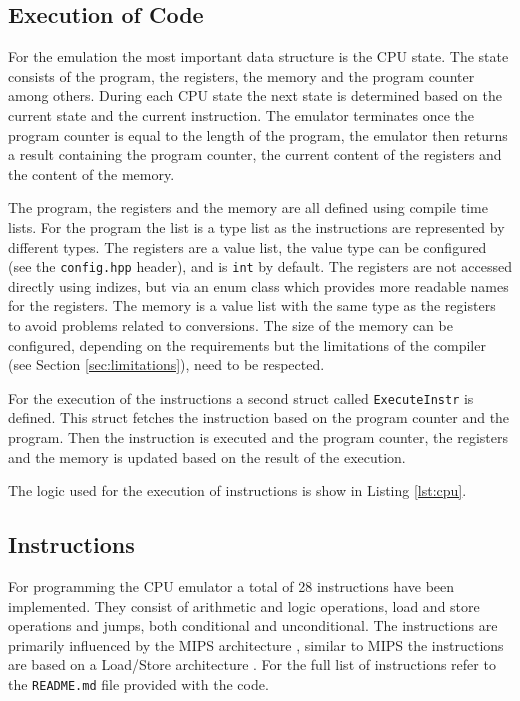 
\subsection{Execution of Code}
For the emulation the most important data structure is the CPU state. The state consists of the program, the registers,
the memory and the program counter among others. During each CPU state the next state is determined based on the 
current state and the current instruction.
The emulator terminates once the program counter is equal to the length of the program,
the emulator then returns a result containing the program counter, the current content
of the registers and the content of the memory.

The program, the registers and the memory are all defined using  compile time lists.
For the program the list is a type list as the instructions are represented by different
types. The registers are a value list, the value type can be configured (see the
\texttt{config.hpp} header), and is \lstinline{int} by default. The registers are not
accessed directly using indizes, but via an enum class which provides
more readable names for the registers. The memory is a value list with the same type
as the registers to avoid problems related to conversions. The size of the memory
can be configured, depending on the requirements but the limitations of the compiler 
(see Section \ref{sec:limitations}), need to be respected.

For the execution of the instructions a second struct called \lstinline{ExecuteInstr} is defined. 
This struct fetches the instruction based on the program counter and the program. Then
the instruction is executed and the program counter, the registers and the memory is
updated based on the result of the execution.

The logic used for the execution of instructions is show in Listing \ref{lst:cpu}.



\subsection{Instructions}
For programming the CPU emulator a total of 28 instructions have been implemented. They consist of arithmetic and logic
operations, load and store operations and jumps, both conditional and unconditional. The instructions are primarily 
influenced by the MIPS architecture , similar to MIPS the instructions are based
on a Load/Store architecture . For the full list of instructions refer to the \texttt{README.md} file provided with the code. 

